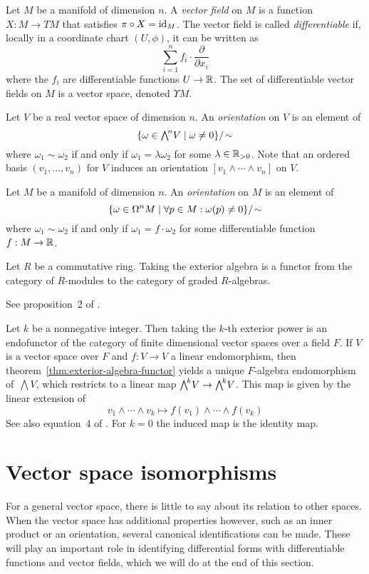 Let $M$ be a manifold of dimension $n$.
A \emph{vector field} on $M$ is a function $X : M \to TM$
that satisfies $\pi \circ X = \operatorname{id}_M$.
The vector field is called \emph{differentiable} if, \pagebreak
locally in a coordinate chart $(U, \phi)$,
it can be written as
\[ \sum_{i = 1}^{n} f_i \cdot \frac{\partial}{\partial x_i} \]
where the $f_i$ are differentiable functions $U \to \mathbb{R}$.
The set of differentiable vector fields on $M$ is a vector space,
denoted $\Upsilon M$.

Let $V$ be a real vector space of dimension $n$.
An \emph{orientation} on $V$ is an element of
\vspace{-0.5\parskip}
\[ \{  \omega \in {\textstyle\bigwedge\nolimits^{\!{n}}} V \mid \omega \neq 0  \} {/\!\sim} \]
where $\omega_1 \sim \omega_2$ if and only if $\omega_1 = \lambda \omega_2$
for some $\lambda \in \mathbb{R}_{>0}$.
Note that an ordered basis $(v_1, \ldots, v_n)$ for $V$ induces
an orientation $[v_1 \wedge \cdots \wedge v_n]$ on $V$.

Let $M$ be a manifold of dimension $n$.
An \emph{orientation} on $M$ is an element of
\vspace{-0.5\parskip}
\[ \{  \omega \in \Omega^n M \mid \forall p \in M : \omega(p) \neq 0  \} {/\!\sim} \]
where $\omega_1 \sim \omega_2$ if and only if $\omega_1 = f \cdot \omega_2$
for some differentiable function $f : M \to \mathbb{R}$.

Let $R$ be a commutative ring.
Taking the exterior algebra is a functor
from the category of $R$-modules
to the category of graded $R$-algebras.

\proof
See proposition~2 of \parencite[ch.~\textsc{iii}, \S~7.2]{bourbaki1970}.

Let $k$ be a nonnegative integer.
Then taking the $k$-th exterior power
is an endofunctor of the category of finite dimensional vector spaces over a field $F$.
If $V$ is a vector space over $F$ and $f : V \to V$ a linear endomorphism,
then theorem~\ref{thm:exterior-algebra-functor} yields
a unique $F$-algebra endomorphism of \,$\bigwedge\!V\!$,
which restricts to a linear map ${\textstyle\bigwedge\nolimits^{\!{k}}} V \to {\textstyle\bigwedge\nolimits^{\!{k}}} V$.
This map is given by the linear extension of
\[ v_1 \wedge \cdots \wedge v_k \longmapsto f(v_1) \wedge \cdots \wedge f(v_k) \]
See also equation~4 of \parencite[ch.~\textsc{iii}, \S~7.2]{bourbaki1970}.
For $k = 0$ the induced map is the identity map.

\section{Vector space isomorphisms}
For a general vector space,
there is little to say about its relation to other spaces.
When the vector space has additional properties however,
such as an inner product or an orientation,
several canonical identifications can be made.
These will play an important role in identifying
differential forms with differentiable functions
and vector fields,
which we will do at the end of this section.

